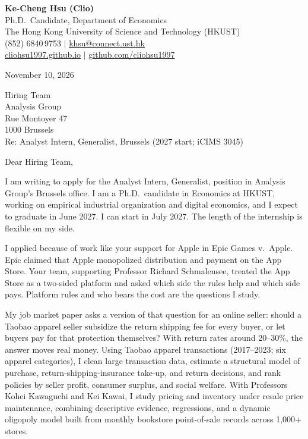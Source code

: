 \documentclass[11pt,letterpaper]{article}
\begin{document}
\noindent
{\bfseries Ke-Cheng Hsu (Clio)}\\
Ph.D.\ Candidate, Department of Economics\\
The Hong Kong University of Science and Technology (HKUST)\\
(852) 6840\,9753 \quad $|$ \quad \href{mailto:khsu@connect.ust.hk}{khsu@connect.ust.hk}\\
\href{https://cliohsu1997.github.io/}{cliohsu1997.github.io} \quad $|$ \quad \href{https://github.com/cliohsu1997}{github.com/cliohsu1997}

\vspace{0.7em}
\noindent
November 10, 2026

\vspace{0.35em}
\noindent
Hiring Team\\
Analysis Group\\
Rue Montoyer 47\\
1000 Brussels\\
Re: Analyst Intern, Generalist, Brussels (2027 start; iCIMS 3045)

\vspace{0.2em}
Dear Hiring Team,

I am writing to apply for the Analyst Intern, Generalist, position in Analysis Group's Brussels office. I am a Ph.D.\ candidate in Economics at HKUST, working on empirical industrial organization and digital economics, and I expect to graduate in June 2027. I can start in July 2027. The length of the internship is flexible on my side.

I applied because of work like your support for Apple in Epic Games v.\ Apple. Epic claimed that Apple monopolized distribution and payment on the App Store. Your team, supporting Professor Richard Schmalensee, treated the App Store as a two-sided platform and asked which side the rules help and which side pays. Platform rules and who bears the cost are the questions I study.

My job market paper asks a version of that question for an online seller: should a Taobao apparel seller subsidize the return shipping fee for every buyer, or let buyers pay for that protection themselves? With return rates around 20--30\%, the answer moves real money. Using Taobao apparel transactions (2017--2023; six apparel categories), I clean large transaction data, estimate a structural model of purchase, return-shipping-insurance take-up, and return decisions, and rank policies by seller profit, consumer surplus, and social welfare. With Professors Kohei Kawaguchi and Kei Kawai, I study pricing and inventory under resale price maintenance, combining descriptive evidence, regressions, and a dynamic oligopoly model built from monthly bookstore point-of-sale records across 1{,}000+ stores.
\end{document}
